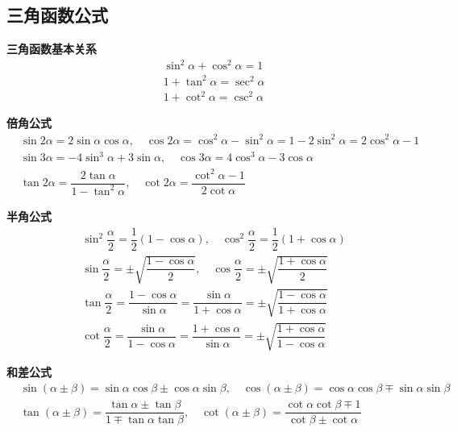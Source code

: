 \subsection{三角函数公式}
\textbf{三角函数基本关系}
\begin{equation}
    \begin{aligned}
        &\sin^2\alpha + \cos^2\alpha = 1 \\
        &1 + \tan^2\alpha = \sec^2\alpha \\
        &1 + \cot^2\alpha = \csc^2\alpha
    \end{aligned}\nonumber
\end{equation}

\textbf{倍角公式}
\begin{equation}
    \begin{aligned}
        & \sin 2\alpha = 2\sin\alpha\cos\alpha, \quad \cos 2\alpha = \cos^2\alpha-\sin^2\alpha = 1 - 2\sin^2\alpha = 2\cos^2\alpha - 1 \\
        & \sin 3\alpha = -4\sin^3\alpha+3\sin\alpha, \quad \cos 3\alpha = 4\cos^3\alpha-3\cos\alpha \\
        & \tan 2\alpha = \dfrac{2\tan\alpha}{1-\tan^2\alpha}, \quad \cot 2\alpha = \dfrac{\cot^2\alpha-1}{2\cot\alpha}
    \end{aligned}\nonumber
\end{equation}

\textbf{半角公式}
\begin{equation}
    \begin{aligned}
        & \sin^2\dfrac{\alpha}{2} = \dfrac{1}{2}(1-\cos\alpha), \quad \cos^2\dfrac{\alpha}{2} = \dfrac{1}{2}(1+\cos\alpha) \\
        & \sin\dfrac{\alpha}{2} = \pm\sqrt{\dfrac{1-\cos\alpha}{2}}, \quad \cos\dfrac{\alpha}{2} = \pm\sqrt{\dfrac{1+\cos\alpha}{2}} \\
        & \tan\dfrac{\alpha}{2} = \dfrac{1-\cos\alpha}{\sin\alpha}=\dfrac{\sin\alpha}{1+\cos\alpha}=\pm\sqrt{\dfrac{1-\cos\alpha}{1+\cos\alpha}} \\ 
        & \cot\dfrac{\alpha}{2} = \dfrac{\sin\alpha}{1-\cos\alpha} = \dfrac{1+\cos\alpha}{\sin\alpha} = \pm\sqrt{\dfrac{1+\cos\alpha}{1-\cos\alpha}}
    \end{aligned} \nonumber
\end{equation}

\textbf{和差公式}
\begin{equation}
    \begin{aligned}
        &\sin(\alpha\pm\beta)=\sin\alpha\cos\beta\pm\cos\alpha\sin\beta, \quad \cos(\alpha\pm\beta)=\cos\alpha\cos\beta\mp\sin\alpha\sin\beta \\
        &\tan(\alpha\pm\beta)=\dfrac{\tan\alpha\pm\tan\beta}{1\mp\tan\alpha\tan\beta}, \quad \cot(\alpha\pm\beta)=\dfrac{\cot\alpha\cot\beta\mp 1}{\cot\beta\pm\cot\alpha}
    \end{aligned}\nonumber
\end{equation}

